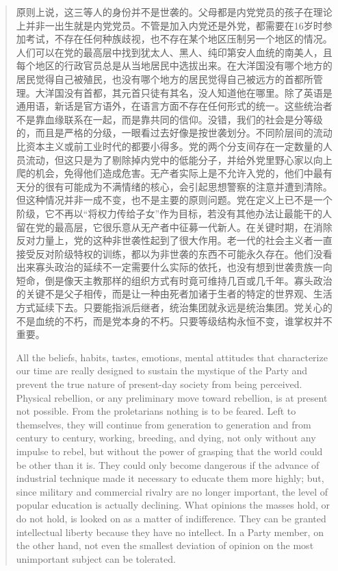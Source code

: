 \begin{paracol}{2}
\begin{quotation}
\switchcolumn

原则上说，这三等人的身份并不是世袭的。父母都是内党党员的孩子在理论上并非一出生就是内党党员。不管是加入内党还是外党，都需要在16岁时参加考试，不存在任何种族歧视，也不存在某个地区压制另一个地区的情况。人们可以在党的最高层中找到犹太人、黑人、纯印第安人血统的南美人，且每个地区的行政官员总是从当地居民中选拔出来。在大洋国没有哪个地方的居民觉得自己被殖民，也没有哪个地方的居民觉得自己被远方的首都所管理。大洋国没有首都，其元首只徒有其名，没人知道他在哪里。除了英语是通用语，新话是官方语外，在语言方面不存在任何形式的统一。这些统治者不是靠血缘联系在一起，而是靠共同的信仰。没错，我们的社会是分等级的，而且是严格的分级，一眼看过去好像是按世袭划分。不同阶层间的流动比资本主义或前工业时代的都要小得多。党的两个分支间存在一定数量的人员流动，但这只是为了剔除掉内党中的低能分子，并给外党里野心家以向上爬的机会，免得他们造成危害。无产者实际上是不允许入党的，他们中最有天分的很有可能成为不满情绪的核心，会引起思想警察的注意并遭到清除。但这种情况并非一成不变，也不是主要的原则问题。党在定义上已不是一个阶级，它不再以``将权力传给子女''作为目标，若没有其他办法让最能干的人留在党的最高层，它很乐意从无产者中征募一代新人。在关键时期，在消除反对力量上，党的这种非世袭性起到了很大作用。老一代的社会主义者一直接受反对阶级特权的训练，都以为非世袭的东西不可能永久存在。他们没看出来寡头政治的延续不一定需要什么实际的依托，也没有想到世袭贵族一向短命，倒是像天主教那样的组织方式有时竟可维持几百或几千年。寡头政治的关键不是父子相传，而是让一种由死者加诸于生者的特定的世界观、生活方式延续下去。只要能指派后继者，统治集团就永远是统治集团。党关心的不是血统的不朽，而是党本身的不朽。只要等级结构永恒不变，谁掌权并不重要。

\switchcolumn*

All the beliefs, habits, tastes, emotions, mental attitudes that
characterize our time are really designed to sustain the mystique of the
Party and prevent the true nature of present-day society from being
perceived. Physical rebellion, or any preliminary move toward rebellion,
is at present not possible. From the proletarians nothing is to be
feared. Left to themselves, they will continue from generation to
generation and from century to century, working, breeding, and dying,
not only without any impulse to rebel, but without the power of grasping
that the world could be other than it is. They could only become
dangerous if the advance of industrial technique made it necessary to
educate them more highly; but, since military and commercial rivalry are
no longer important, the level of popular education is actually
declining. What opinions the masses hold, or do not hold, is looked on
as a matter of indifference. They can be granted intellectual liberty
because they have no intellect. In a Party member, on the other hand,
not even the smallest deviation of opinion on the most unimportant
subject can be tolerated.


\end{quotation}
\end{paracol}
